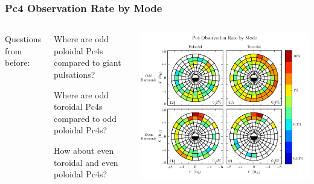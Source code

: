 \documentclass{beamer}
\begin{document}
\begin{frame}
\frametitle{Pc4 Observation Rate by Mode}

\begin{columns}
Questions from before:

\vspace{5pt}

\begin{wideitemize}
\item Where are odd poloidal Pc4s compared to giant pulsations?
\item Where are odd toroidal Pc4s compared to odd poloidal Pc4s?
\item How about even toroidal and even poloidal Pc4s?
\end{wideitemize}
\includegraphics[width=\textwidth]{figures/mode_all_sharp.pdf}
\end{columns}

\end{frame}

\end{document}
